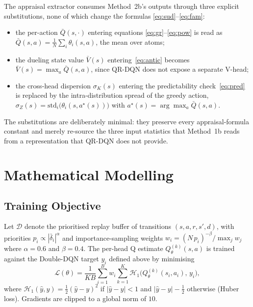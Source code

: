 \documentclass[conference]{IEEEtran}
\begin{document}
The appraisal extractor consumes Method~2b's outputs through three
explicit substitutions, none of which change the formulas
\eqref{eq:sud}--\eqref{eq:fam}:
\begin{itemize}
\item the per-action $\bar Q(s, \cdot)$ entering equations
\eqref{eq:gr}--\eqref{eq:pow} is read as $\bar Q(s, a) =
\tfrac{1}{N} \sum_{i} \theta_{i}(s, a)$, the mean over atoms;
\item the dueling state value $\bar V(s)$ entering~\eqref{eq:antic}
becomes $\bar V(s) = \max_{a} \bar Q(s, a)$, since QR-DQN does not
expose a separate V-head;
\item the cross-head dispersion $\sigma_{K}(s)$ entering the
predictability check~\eqref{eq:pred} is replaced by the
intra-distribution spread of the greedy action,
$\sigma_{Z}(s) = \mathrm{std}_{i}\big(\theta_{i}(s, a^{\star}(s))\big)$
with $a^{\star}(s) = \arg\max_{a} \bar Q(s, a)$.
\end{itemize}
The substitutions are deliberately minimal: they preserve every
appraisal-formula constant and merely re-source the three input
statistics that Method~1b reads from a representation that QR-DQN does
not provide.

\section{Mathematical Modelling}
\label{sec:math}

\subsection{Training Objective}
Let $\mathcal{D}$ denote the prioritised replay buffer of transitions
$(s, a, r, s', d)$, with priorities $p_{i} \propto |\bar\delta_{i}|^{\alpha}$
and importance-sampling weights
$w_{i} = (N\, p_{i})^{-\beta}/\max_{j} w_{j}$ where $\alpha = 0.6$ and
$\beta = 0.4$. The per-head Q estimate
$Q^{(k)}_{\theta}(s, a)$ is trained against the Double-DQN target
$y_{i}$ defined above by minimising
\begin{equation}
\mathcal{L}(\theta) =
\frac{1}{KB} \sum_{i=1}^{B} w_{i} \sum_{k=1}^{K}
\mathcal{H}_{1}\!\big( Q^{(k)}_{\theta}(s_{i}, a_{i}),\, y_{i} \big),
\end{equation}
where $\mathcal{H}_{1}(\hat y, y) = \tfrac{1}{2}(\hat y - y)^{2}$ if
$|\hat y - y| < 1$ and $|\hat y - y| - \tfrac{1}{2}$ otherwise (Huber loss).
Gradients are clipped to a global norm of $10$.
\end{document}
